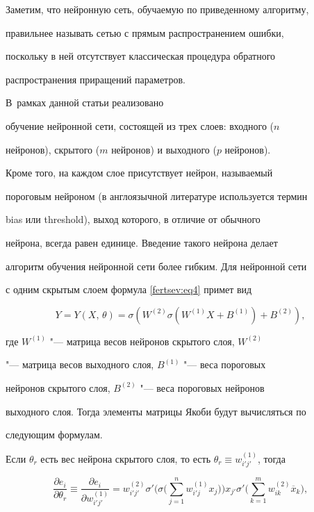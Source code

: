 Заметим, что нейронную сеть, обучаемую по приведенному алгоритму,

правильнее называть сетью с прямым распространением ошибки,

поскольку в ней отсутствует классическая процедура обратного

распространения приращений параметров.



 \linebreak В~рамках данной статьи реализовано

обучение нейронной сети, состоящей из трех слоев: входного ($n$

нейронов), скрытого ($m$ нейронов) и выходного ($p$ нейронов).

Кроме того, на каждом слое присутствует нейрон, называемый

пороговым нейроном (в англоязычной литературе используется термин

bias или threshold), выход которого, в отличие от обычного

нейрона, всегда равен единице. Введение такого нейрона делает

алгоритм обучения нейронной сети более гибким. Для нейронной сети

с одним скрытым слоем формула \eqref{fertsev:eq4} примет вид

\[

Y =Y(X,\,\theta)=\sigma \left(W^{(2)}\sigma (W^{(1)}X

+B^{(1)})+B^{(2)}\right),

\]

где $W^{(1)}$ "--- матрица весов нейронов скрытого слоя, $W^{(2)}$

"--- матрица весов выходного слоя, $B^{(1)}$ "--- веса пороговых

нейронов скрытого слоя, $B^{(2)}$ "--- веса пороговых нейронов

выходного слоя. Тогда элементы матрицы Якоби будут вычисляться по

следующим формулам.



Если $\theta_r$ есть вес нейрона скрытого слоя, то есть $\theta

_r\equiv w^{(1)}_{i'j'}$, тогда

\[

\frac{\partial e_i}{\partial \theta_r}\equiv \frac{\partial e_i}{\partial w^{( 1 )}_{i'j'}} =w^{(2)}_{i'j'}\sigma'

\Biggl(\sigma \Biggl(\sum^n_{j =1}

w^{(1)}_{i'j}x_j\Biggr)\Biggr)x_{j'}\sigma'

\Biggl(\sum^m_{k=1}w^{(2)}_{ik}\overline{x}_k\Biggr),

\]

